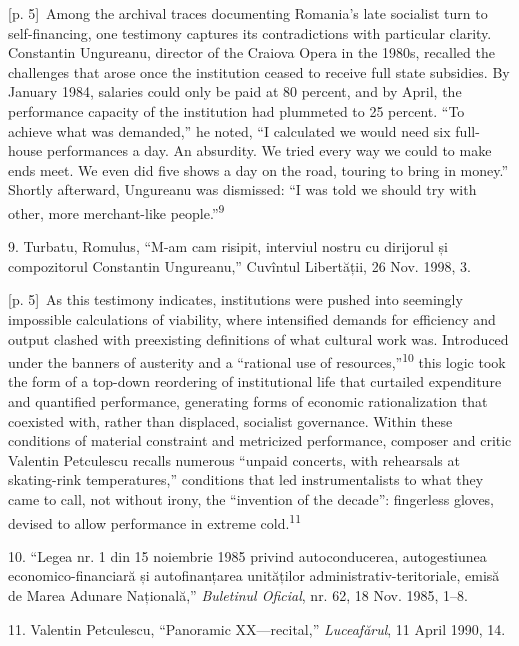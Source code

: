 \documentclass[10pt,a4paper]{article}
\begin{document}
{\scriptsize\color{gray} [p. 5]}\ Among the archival traces documenting Romania’s late socialist turn to self-financing, one testimony captures its contradictions with particular clarity. Constantin Ungureanu, director of the Craiova Opera in the 1980s, recalled the challenges that arose once the institution ceased to receive full state subsidies. By January 1984, salaries could only be paid at 80 percent, and by April, the performance capacity of the institution had plummeted to 25 percent. “To achieve what was demanded,” he noted, “I calculated we would need six full-house performances a day. An absurdity. We tried every way we could to make ends meet. We even did five shows a day on the road, touring to bring in money.” Shortly afterward, Ungureanu was dismissed: “I was told we should try with other, more merchant-like people.”\nobreak\textsuperscript{9}\par{\small 9. Turbatu, Romulus, “M-am cam risipit, interviul nostru cu dirijorul și compozitorul Constantin Ungureanu,” Cuvîntul Libertății, 26 Nov. 1998, 3.\par}
{\scriptsize\color{gray} [p. 5]}\ As this testimony indicates, institutions were pushed into seemingly impossible calculations of viability, where intensified demands for efficiency and output clashed with preexisting definitions of what cultural work was. Introduced under the banners of austerity and a “rational use of resources,”\nobreak\textsuperscript{10} this logic took the form of a top-down reordering of institutional life that curtailed expenditure and quantified performance, generating forms of economic rationalization that coexisted with, rather than displaced, socialist governance. Within these conditions of material constraint and metricized performance, composer and critic Valentin Petculescu recalls numerous “unpaid concerts, with rehearsals at skating-rink temperatures,” conditions that led instrumentalists to what they came to call, not without irony, the “invention of the decade”: fingerless gloves, devised to allow performance in extreme cold.\nobreak\textsuperscript{11}\par{\small 10. “Legea nr. 1 din 15 noiembrie 1985 privind autoconducerea, autogestiunea economico-financiară și autofinanțarea unităților administrativ-teritoriale, emisă de Marea Adunare Națională,” \textit{Buletinul Oficial}, nr. 62, 18 Nov. 1985, 1–8.\par}{\small 11. Valentin Petculescu, “Panoramic XX—recital,” \textit{Luceafărul}, 11 April 1990, 14.\par}
\end{document}
